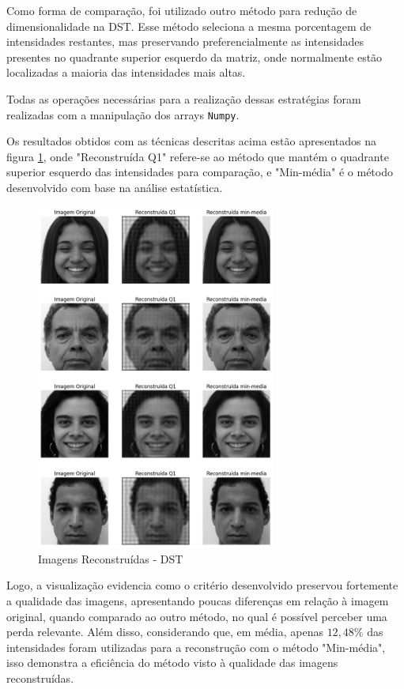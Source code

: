 \documentclass[a4paper, 11pt]{article}
\begin{document}
Como forma de comparação, foi utilizado outro método para redução de dimensionalidade na DST. Esse método seleciona a mesma porcentagem de intensidades restantes, mas preservando preferencialmente as intensidades presentes no quadrante superior esquerdo da matriz, onde normalmente estão localizadas a maioria das intensidades mais altas.

Todas as operações necessárias para a realização dessas estratégias foram realizadas com a manipulação dos arrays \texttt{Numpy}.

Os resultados obtidos com as técnicas descritas acima estão apresentados na figura \ref{fig:4_recons}, onde "Reconstruída Q1" refere-se ao método que mantém o quadrante superior esquerdo das intensidades para comparação, e "Min-média" é o método desenvolvido com base na análise estatística.

\begin{figure} [H]
    \centering 
    \includegraphics[width=0.7\textwidth]{imgs/4_recons.png}
    \caption{Imagens Reconstruídas - DST}
    \label{fig:4_recons} %
\end{figure}

Logo, a visualização evidencia como o critério desenvolvido preservou fortemente a qualidade das imagens, apresentando poucas diferenças em relação à imagem original, quando comparado ao outro método, no qual é possível perceber uma perda relevante. Além disso, considerando que, em média, apenas $12,48\%$ das intensidades foram utilizadas para a reconstrução com o método "Min-média", isso demonstra a eficiência do método visto à qualidade das imagens reconstruídas.
\end{document}
